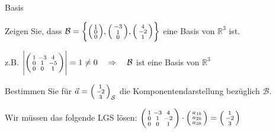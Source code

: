 \begin{example2}{Basis}

    Zeigen Sie, dass $\mathcal{B}=\left\{\begin{psmallmatrix}1 \\ 0 \\ 0\end{psmallmatrix},\begin{psmallmatrix}-3 \\ 1 \\ 0\end{psmallmatrix},\begin{psmallmatrix}4 \\ -2 \\ 1\end{psmallmatrix}\right\}$ eine Basis von $\mathbb{R}^{3}$ ist.
    
    z.B. $\left|\begin{psmallmatrix}1 & -3 & 4 \\ 0 & 1 & -5 \\ 0 & 0 & 1\end{psmallmatrix}\right|=1 \neq 0 \quad \Rightarrow \quad \mathcal{B}$ ist eine Basis von $\mathbb{R}^{3}$

    \vspace{3mm}

    Bestimmen Sie für $\vec{a}=\begin{psmallmatrix}1 \\ -2 \\ 3\end{psmallmatrix}_{\mathcal{S}}$ die Komponentendarstellung bezüglich $\mathcal{B}$.

    Wir müssen das folgende LGS lösen: $\begin{psmallmatrix}1 & -3 & 4 \\ 0 & 1 & -2 \\ 0 & 0 & 1\end{psmallmatrix} \cdot\begin{psmallmatrix}a_{1 b} \\ a_{2 b} \\ a_{3 b}\end{psmallmatrix}=\begin{psmallmatrix}1 \\ -2 \\ 3\end{psmallmatrix}$


\end{example2}

